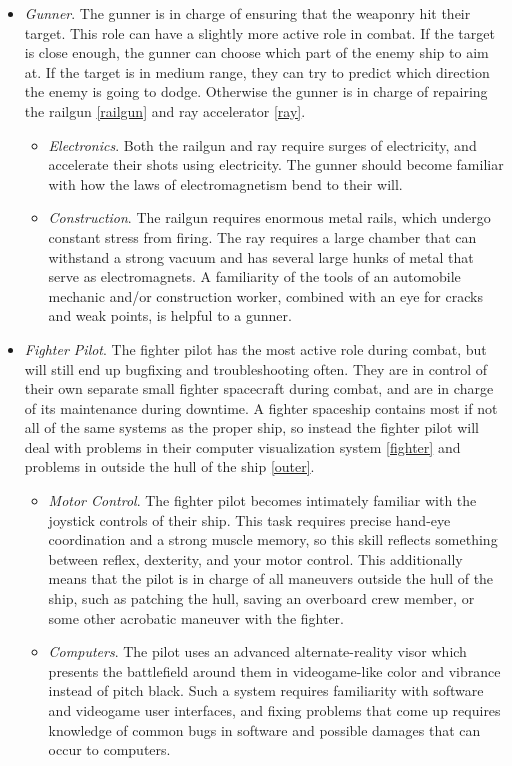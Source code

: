 \documentclass[a4paper]{article}
\begin{document}
\begin{itemize}
\begin{itemize}
\end{itemize}
\item \textit{Gunner}. The gunner is in charge of ensuring that the weaponry hit their target. This role can have a slightly more active role in combat. If the target is close enough, the gunner can choose which part of the enemy ship to aim at. If the target is in medium range, they can try to predict which direction the enemy is going to dodge. Otherwise the gunner is in charge of repairing the railgun \ref{railgun} and ray accelerator \ref{ray}.
\begin{itemize}
\item \textit{Electronics}. Both the railgun and ray require surges of electricity, and accelerate their shots using electricity. The gunner should become familiar with how the laws of electromagnetism bend to their will.
\item \textit{Construction}. The railgun requires enormous metal rails, which undergo constant stress from firing. The ray requires a large chamber that can withstand a strong vacuum and has several large hunks of metal that serve as electromagnets. A familiarity of the tools of an automobile mechanic and/or construction worker, combined with an eye for cracks and weak points, is helpful to a gunner.
\end{itemize}
\item \textit{Fighter Pilot}. The fighter pilot has the most active role during combat, but will still end up bugfixing and troubleshooting often. They are in control of their own separate small fighter spacecraft during combat, and are in charge of its maintenance during downtime. A fighter spaceship contains most if not all of the same systems as the proper ship, so instead the fighter pilot will deal with problems in their computer visualization system \ref{fighter} and problems in outside the hull of the ship \ref{outer}. 
\begin{itemize}
\item \textit{Motor Control}. The fighter pilot becomes intimately familiar with the joystick controls of their ship. This task requires precise hand-eye coordination and a strong muscle memory, so this skill reflects something between reflex, dexterity, and your motor control. This additionally means that the pilot is in charge of all maneuvers outside the hull of the ship, such as patching the hull, saving an overboard crew member, or some other acrobatic maneuver with the fighter.
\item \textit{Computers}. The pilot uses an advanced alternate-reality visor which presents the battlefield around them in videogame-like color and vibrance instead of pitch black. Such a system requires familiarity with software and videogame user interfaces, and fixing problems that come up requires knowledge of common bugs in software and possible damages that can occur to computers.
\end{itemize}
\end{itemize}
\end{document}
